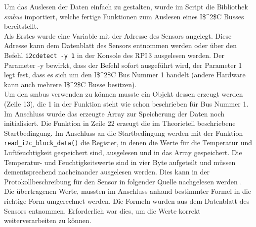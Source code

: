 Um das Auslesen der Daten einfach zu gestalten, wurde im Script die Bibliothek \textit{smbus} importiert, welche fertige Funktionen zum Auslesen eines \ac{I$^2$C} Busses bereitstellt.\\
Als Erstes wurde eine Variable mit der Adresse des Sensors angelegt. Diese Adresse kann dem Datenblatt des Sensors entnommen werden oder über den Befehl \texttt{i2cdetect -y 1} in der Konsole des \ac{RPI}\,3 ausgelesen werden. Der Parameter -y bewirkt, dass der Befehl sofort ausgeführt wird, der Parameter 1 legt fest, dass es sich um den \ac{I$^2$C} Bus Nummer 1 handelt (andere Hardware kann auch mehrere \ac{I$^2$C} Busse besitzen).\\
Um den smbus verwenden zu können musste ein Objekt dessen erzeugt werden (Zeile 13), die 1 in der Funktion steht wie schon beschrieben für Bus Nummer 1. Im Anschluss wurde das erzeugte Array zur Speicherung der Daten noch initialisiert. Die Funktion in Zeile 22 erzeugt die im Theorieteil beschriebene Startbedingung. Im Anschluss an die Startbedingung werden mit der Funktion \texttt{read\_i2c\_block\_data()} die Register, in denen die Werte für die Temperatur und Luftfeuchtigkeit gespeichert sind, ausgelesen und in das Array gespeichert. Die Temperatur- und Feuchtigkeitswerte sind in vier Byte aufgeteilt und müssen dementsprechend nacheinander ausgelesen werden. Dies kann in der Protokollbeschreibung für den Sensor in folgender Quelle nachgelesen werden \citep{Datenblatt_I2C_HYT221}. Die übertragenen Werte, mussten im Anschluss anhand bestimmter Formel in die richtige Form umgerechnet werden. Die Formeln wurden aus dem Datenblatt des Sensors entnommen. Erforderlich war dies, um die Werte korrekt weiterverarbeiten zu können.



